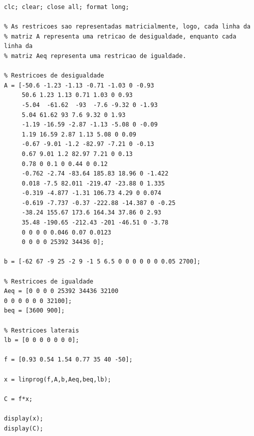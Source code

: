 \documentclass[12pt]{article}
\begin{document}
 	\begin{lstlisting}	
clc; clear; close all; format long;

% As restricoes sao representadas matricialmente, logo, cada linha da
% matriz A representa uma retricao de desigualdade, enquanto cada linha da
% matriz Aeq representa uma restricao de igualdade. 

% Restricoes de desigualdade
A = [-50.6 -1.23 -1.13 -0.71 -1.03 0 -0.93 
     50.6 1.23 1.13 0.71 1.03 0 0.93
     -5.04  -61.62  -93  -7.6 -9.32 0 -1.93
     5.04 61.62 93 7.6 9.32 0 1.93 
     -1.19 -16.59 -2.87 -1.13 -5.08 0 -0.09
     1.19 16.59 2.87 1.13 5.08 0 0.09
     -0.67 -9.01 -1.2 -82.97 -7.21 0 -0.13 
     0.67 9.01 1.2 82.97 7.21 0 0.13
     0.78 0 0.1 0 0.44 0 0.12 
     -0.762 -2.74 -83.64 185.83 18.96 0 -1.422
     0.018 -7.5 82.011 -219.47 -23.88 0 1.335
     -0.319 -4.877 -1.31 106.73 4.29 0 0.074
     -0.619 -7.737 -0.37 -222.88 -14.387 0 -0.25
     -38.24 155.67 173.6 164.34 37.86 0 2.93
     35.48 -190.65 -212.43 -201 -46.51 0 -3.78
     0 0 0 0 0.046 0.07 0.0123
     0 0 0 0 25392 34436 0];

b = [-62 67 -9 25 -2 9 -1 5 6.5 0 0 0 0 0 0 0.05 2700];

% Restricoes de igualdade
Aeq = [0 0 0 0 25392 34436 32100
0 0 0 0 0 0 32100];
beq = [3600 900];

% Restricoes laterais
lb = [0 0 0 0 0 0 0];

f = [0.93 0.54 1.54 0.77 35 40 -50];

x = linprog(f,A,b,Aeq,beq,lb);

C = f*x;

display(x);
display(C);
 	\end{lstlisting}
 	
\end{document}
